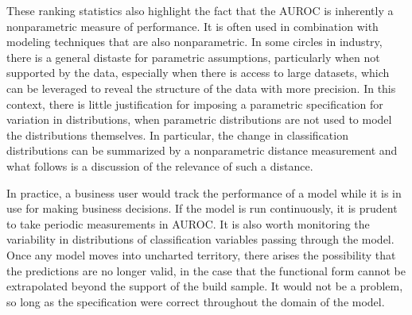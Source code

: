 These ranking statistics also highlight the fact that the AUROC is inherently a nonparametric measure of performance.
It is often used in combination with modeling techniques that are also nonparametric.
%
In some circles in industry, there is a general distaste for parametric assumptions, particularly when not supported by the data, especially when there is access to large datasets, which can be leveraged to reveal the structure of the data with more precision.
%
In this context, there is little justification for imposing a parametric specification for variation in distributions, when parametric distributions are not used to model the distributions themselves.
%
In particular, the change in classification distributions can be summarized by a nonparametric distance measurement and what follows is a discussion of the relevance of such a distance.





In practice, a business user would track the performance of a model while it is in use for making business decisions.
If the model is run continuously, it is prudent to take periodic measurements in AUROC.
It is also worth monitoring the variability in distributions of classification variables passing through the model.
Once any model moves into uncharted territory, there arises the possibility that the predictions are no longer valid, in the case that the functional form cannot be extrapolated beyond the support of the build sample.
It would not be a problem, so long as the specification were correct throughout the domain of the model.

